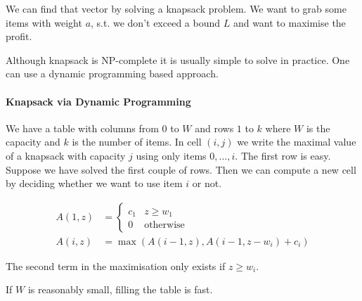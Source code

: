 We can find that vector by solving a knapsack problem. We want to grab some items with weight $a$, s.t. we don't exceed a bound $L$ and want to maximise the profit. 

Although knapsack is NP-complete it is usually simple to solve in practice. One can use a dynamic programming based approach.

\paragraph{Knapsack via Dynamic Programming} We have a table with columns from $0$ to $W$ and rows $1$ to $k$ where $W$ is the capacity and $k$ is the number of items. In cell $(i,j)$ we write the maximal value of a knapsack with capacity $j$ using only items $0,\ldots, i$. The first row is easy. Suppose we have solved the first couple of rows. Then we can compute a new cell by deciding whether we want to use item $i$ or not. 

\begin{align*}
A(1,z) &= \begin{cases} c_1 & z\geq w_1\\
0 & \text{otherwise}\end{cases}\\
A(i,z) &= \max (A(i-1,z), A(i-1,z-w_i)+c_i)
\end{align*}

The second term in the maximisation only exists if $z\geq w_i$.

If $W$ is reasonably small, filling the table is fast.
